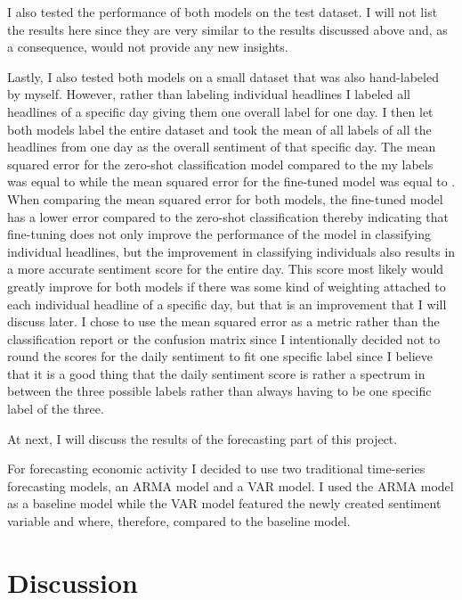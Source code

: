 \documentclass[11pt, a4paper, leqno]{article}
\begin{document}
I also tested the performance of both models on the test dataset. I will not list the results here since they are very similar to the results discussed above and, as a consequence, would not provide any new insights.

Lastly, I also tested both models on a small dataset that was also hand-labeled by myself. However, rather than labeling individual headlines I labeled all headlines of a specific day giving them one overall label for one day. I then let both models label the entire dataset and took the mean of all labels of all the headlines from one day as the overall sentiment of that specific day.
The mean squared error for the zero-shot classification model compared to the my labels was equal to  while the mean squared error for the fine-tuned model was equal to . When comparing the mean squared error for both models, the fine-tuned model has a lower error compared to the zero-shot classification thereby indicating that fine-tuning does not only improve the performance of the model in classifying individual headlines, but the improvement in classifying individuals also results in a more accurate sentiment score for the entire day. This score most likely would greatly improve for both models if there was some kind of weighting attached to each individual headline of a specific day, but that is an improvement that I will discuss later.
I chose to use the mean squared error as a metric rather than the classification report or the confusion matrix since I intentionally decided not to round the scores for the daily sentiment to fit one specific label since I believe that it is a good thing that the daily sentiment score is rather a spectrum in between the three possible labels rather than always having to be one specific label of the three. 

At next, I will discuss the results of the forecasting part of this project.

For forecasting economic activity I decided to use two traditional time-series forecasting models, an ARMA model and a VAR model. I used the ARMA model as a baseline model while the VAR model featured the newly created sentiment variable and where, therefore, compared to the baseline model.





\section{Discussion}
\end{document}
